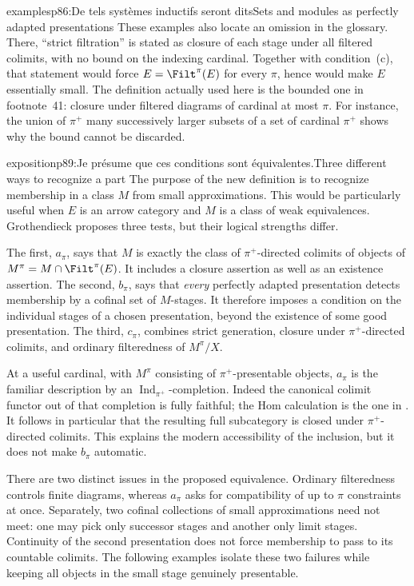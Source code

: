 \begin{dcomment}{examples}{p86:De tels systèmes inductifs seront dits}{Sets and modules as perfectly adapted presentations}
These examples also locate an omission in the glossary. There, ``strict filtration'' is stated as closure of each stage under all filtered colimits, with no bound on the indexing cardinal. Together with condition~(c), that statement would force $E=\Filt^\pi(E)$ for every $\pi$, hence would make $E$ essentially small. The definition actually used here is the bounded one in footnote~41: closure under filtered diagrams of cardinal at most $\pi$. For instance, the union of $\pi^+$ many successively larger subsets of a set of cardinal $\pi^+$ shows why the bound cannot be discarded.
\end{dcomment}

\begin{dcomment}{exposition}{p89:Je présume que ces conditions sont équivalentes.}{Three different ways to recognize a part}
The purpose of the new definition is to recognize membership in a class $M$ from small approximations. This would be particularly useful when $E$ is an arrow category and $M$ is a class of weak equivalences. Grothendieck proposes three tests, but their logical strengths differ.

The first, $a_\pi$, says that $M$ is exactly the class of $\pi^+$-directed colimits of objects of $M^\pi=M\cap\Filt^\pi(E)$. It includes a closure assertion as well as an existence assertion. The second, $b_\pi$, says that \emph{every} perfectly adapted presentation detects membership by a cofinal set of $M$-stages. It therefore imposes a condition on the individual stages of a chosen presentation, beyond the existence of some good presentation. The third, $c_\pi$, combines strict generation, closure under $\pi^+$-directed colimits, and ordinary filteredness of $M^\pi/X$.

At a useful cardinal, with $M^\pi$ consisting of $\pi^+$-presentable objects, $a_\pi$ is the familiar description by an $\operatorname{Ind}_{\pi^+}$-completion. Indeed the canonical colimit functor out of that completion is fully faithful; the Hom calculation is the one in \citet[I, 9.18(a)]{SGA4I1972}. It follows in particular that the resulting full subcategory is closed under $\pi^+$-directed colimits. This explains the modern accessibility of the inclusion, but it does not make $b_\pi$ automatic.

There are two distinct issues in the proposed equivalence. Ordinary filteredness controls finite diagrams, whereas $a_\pi$ asks for compatibility of up to $\pi$ constraints at once. Separately, two cofinal collections of small approximations need not meet: one may pick only successor stages and another only limit stages. Continuity of the second presentation does not force membership to pass to its countable colimits. The following examples isolate these two failures while keeping all objects in the small stage genuinely presentable.
\end{dcomment}

